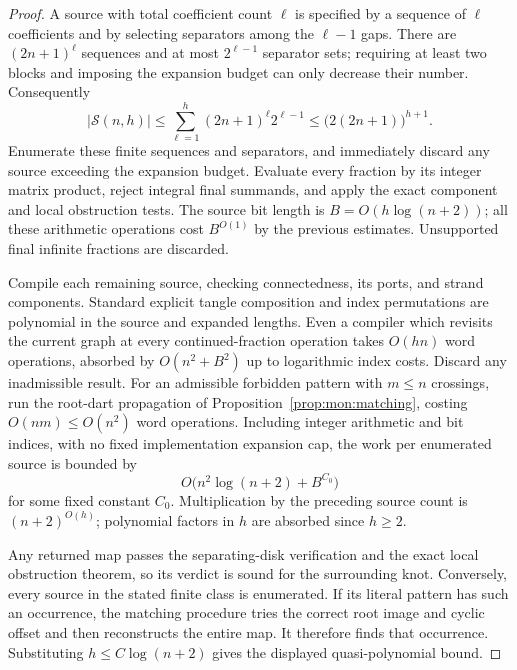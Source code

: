 \documentclass[11pt,a4paper]{article}
\theoremstyle{definition}
\theoremstyle{remark}
\numberwithin{equation}{section}
\begin{document}
\begin{proof}
A source with total coefficient count $\ell$ is specified by a sequence of
$\ell$ coefficients and by selecting separators among the $\ell-1$ gaps.
There are $(2n+1)^\ell$ sequences and at most $2^{\ell-1}$ separator sets;
requiring at least two blocks and imposing the expansion budget can only
decrease their number.  Consequently
\[
 |\mathcal S(n,h)|
 \le \sum_{\ell=1}^{h}(2n+1)^\ell 2^{\ell-1}
 \le \bigl(2(2n+1)\bigr)^{h+1}.
\]
Enumerate these finite sequences and separators, and immediately discard any
source exceeding the expansion budget.  Evaluate every fraction by its
integer matrix product, reject integral final summands, and apply the exact
component and local obstruction tests.  The source bit length is
$B=O(h\log(n+2))$; all these arithmetic operations cost $B^{O(1)}$ by the
previous estimates.  Unsupported final infinite fractions are discarded.

Compile each remaining source, checking connectedness, its ports, and strand
components.  Standard explicit tangle composition and index permutations
are polynomial in the source and expanded lengths.  Even a compiler which
revisits the current graph at every continued-fraction operation takes
$O(hn)$ word operations, absorbed by
$O(n^2+B^2)$ up to logarithmic index costs.  Discard any inadmissible result.
For an admissible forbidden pattern with $m\le n$ crossings, run the
root-dart propagation of Proposition~\ref{prop:mon:matching}, costing
$O(nm)\le O(n^2)$ word operations.  Including integer arithmetic and bit
indices, with no fixed implementation expansion cap, the work per enumerated source is bounded by
\[
 O\bigl(n^2\log(n+2)+B^{C_0}\bigr)
\]
for some fixed constant $C_0$.  Multiplication by the preceding source count
is $(n+2)^{O(h)}$; polynomial factors in $h$ are absorbed since $h\ge2$.

Any returned map passes the separating-disk verification and the exact local
obstruction theorem, so its verdict is sound for the surrounding knot.
Conversely, every source in the stated finite class is enumerated.  If its
literal pattern has such an occurrence, the matching procedure tries the
correct root image and cyclic offset and then reconstructs the entire map.
It therefore finds that occurrence.  Substituting
$h\le C\log(n+2)$ gives the displayed quasi-polynomial bound.
\end{proof}
\end{document}
